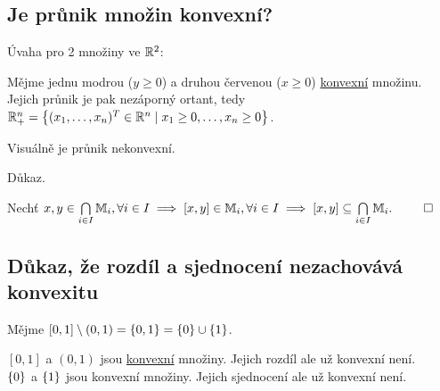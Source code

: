 \subsection{Je průnik množin konvexní?}
Úvaha pro 2 množiny ve $\mathbb{R}^2$:

\begin{multicols}{2}
    Mějme jednu modrou ($y \geq 0$) a druhou červenou ($x \geq 0$) \hyperref[sec:konvex]{konvexní} množinu. Jejich 
    průnik je pak nezáporný ortant, tedy \\
    $\mathbb{R}_+^n = \left\lbrace (x_1, \dots, x_n)^T \in \mathbb{R}^n \mid x_1 \geq 0, \dots, x_n \geq 0 \right\rbrace$.

    Visuálně je průnik nekonvexní.

    Důkaz.

    Nechť ${x,y \in \bigcap\limits_{i \in I} \mathbb{M}_{i}, \forall i \in I \implies [x, y] \in \mathbb{M}_i, \forall i \in I
    \implies [x,y] \subseteq \bigcap\limits_{i \in I} \mathbb{M}_{i}.}$
    $\qed$

\columnbreak

    \begin{center}
    \end{center}
\end{multicols}

\subsection{Důkaz, že rozdíl a sjednocení nezachovává konvexitu}
Mějme $[0,1] \setminus (0,1) = \left\lbrace 0,1 \right\rbrace = \left\lbrace 0 \right\rbrace \cup \left\lbrace 1 \right\rbrace$.

$[0,1]$ a $(0,1)$ jsou \hyperref[sec:konvex]{konvexní} množiny. Jejich rozdíl ale už konvexní není.\\
$\left\lbrace 0 \right\rbrace$ a $\left\lbrace 1 \right\rbrace$ jsou konvexní množiny. Jejich sjednocení ale už konvexní není.

